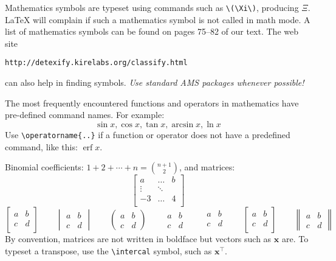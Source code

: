 \documentclass[11pt]{article}
\begin{document}
Mathematics symbols are typeset using commands such as \verb~\(\Xi\)~,
producing \(\Xi\).  \LaTeX{} will complain if such a mathematics symbol is not
called in math mode.  A list of mathematics symbols can be found on pages 75--82
of our text.  The web site
\begin{center}
  \texttt{http://detexify.kirelabs.org/classify.html}
\end{center}
can also help in finding symbols.  \emph{Use standard AMS packages whenever
  possible!}

The most frequently encountered functions and operators in mathematics have
pre-defined command names.  For example:
\[
  \sin x, \cos x, \tan x, \arcsin x, \ln x
\]
Use \verb~\operatorname{..}~ if a function or operator does not have a
predefined command, like this: \(\operatorname{erf}x\).

Binomial coefficients:
\({\displaystyle 1 + 2 + \cdots + n = \binom{n+1}{2}}\), and matrices:
\begin{equation*}
  \begin{bmatrix}
    a & \dots & b \\
    \vdots  & \ddots & \\
    -3 & \dots & 4     \\
  \end{bmatrix}
\end{equation*}
\begin{equation*}
  \begin{bmatrix}
    a & b \\
    c & d \\
  \end{bmatrix}
  \qquad
  \begin{vmatrix}
    a & b \\
    c & d
  \end{vmatrix}
  \qquad
  \begin{pmatrix}
    a & b \\
    c & d
  \end{pmatrix}
  \qquad
  \begin{matrix}
    a & b \\
    c & d
  \end{matrix}
  \qquad
  \begin{smallmatrix}
    a & b \\
    c & d \\
  \end{smallmatrix}
  \qquad
  \left[
  \begin{smallmatrix}
    a & b \\
    c & d \\
  \end{smallmatrix}
  \right]
  \qquad
  \begin{Vmatrix}
    a & b \\
    c & d
  \end{Vmatrix}
\end{equation*}
By convention, matrices are not written in boldface but vectors such as
\(\mathbf{x}\) are.  To typeset a transpose, use the \verb~\intercal~ symbol, such as
\(\mathbf{x}^\intercal\).
\end{document}
